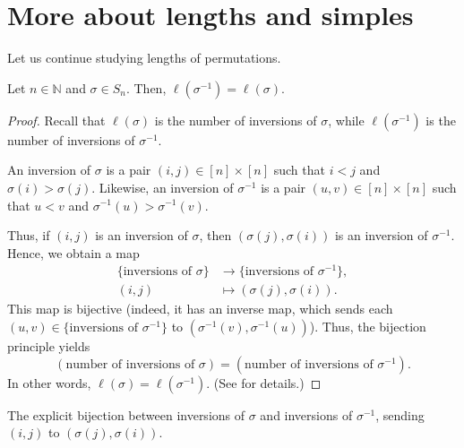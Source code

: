 \section{More about lengths and simples}

Let us continue studying lengths of permutations.


\begin{proposition}
\label{prop.perm.len.inv}
\leantarget
\leanok
Let $n \in \mathbb{N}$ and $\sigma \in S_n$. Then,
$\ell(\sigma^{-1}) = \ell(\sigma)$.
\end{proposition}

\begin{proof}
\leanok
Recall that $\ell(\sigma)$ is the number of inversions of $\sigma$,
while $\ell(\sigma^{-1})$ is the number of inversions of $\sigma^{-1}$.

An inversion of $\sigma$ is a pair $(i,j) \in [n] \times [n]$ such that
$i < j$ and $\sigma(i) > \sigma(j)$. Likewise, an inversion of $\sigma^{-1}$
is a pair $(u,v) \in [n] \times [n]$ such that $u < v$ and
$\sigma^{-1}(u) > \sigma^{-1}(v)$.

Thus, if $(i,j)$ is an inversion of $\sigma$, then
$(\sigma(j), \sigma(i))$ is an inversion of $\sigma^{-1}$.
Hence, we obtain a map
\begin{align*}
\{\text{inversions of } \sigma\} &\to \{\text{inversions of } \sigma^{-1}\}, \\
(i,j) &\mapsto (\sigma(j), \sigma(i)).
\end{align*}
This map is bijective (indeed, it has an inverse map, which sends
each $(u,v) \in \{\text{inversions of } \sigma^{-1}\}$ to
$(\sigma^{-1}(v), \sigma^{-1}(u))$). Thus, the bijection principle yields
\[
(\text{number of inversions of } \sigma) = (\text{number of inversions of } \sigma^{-1}).
\]
In other words, $\ell(\sigma) = \ell(\sigma^{-1})$.
(See \cite[Exercise 5.2 \textbf{(f)}]{detnotes} for details.)
\end{proof}


\begin{definition}
\label{def.perm.inversionsBijection}
\leanhelper
\leanok
The explicit bijection between inversions of $\sigma$ and inversions of $\sigma^{-1}$,
sending $(i,j)$ to $(\sigma(j), \sigma(i))$.
\end{definition}

